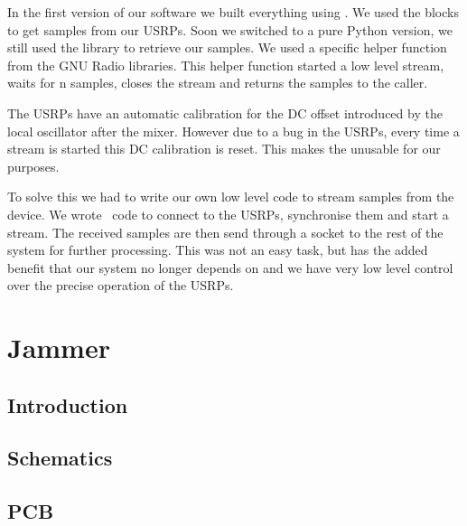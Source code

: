 \documentclass[a4paper, openany, oneside]{memoir}
\begin{document}
In the first version of our software we built everything using . We used the  blocks to get samples from our USRPs. Soon we switched to a pure Python version, we still used the  library to retrieve our samples. We used a specific helper function  from the GNU Radio libraries. This helper function started a low level stream, waits for n samples, closes the stream and returns the samples to the caller.

The USRPs have an automatic calibration for the DC offset introduced by the local oscillator after the mixer. However due to a bug in the USRPs, every time a stream is started this DC calibration is reset. This makes the  unusable for our purposes.

To solve this we had to write our own low level code to stream samples from the device. We wrote \CC~code to connect to the USRPs, synchronise them and start a stream. The received samples are then send through a socket to the rest of the system for further processing. This was not an easy task, but has the added benefit that our system no longer depends on  and we have very low level control over the precise operation of the USRPs.

\section{Jammer}
\label{sec:jammer}

\subsection{Introduction}
\label{sec:introduction-1}


\subsection{Schematics}
\label{sec:schematics}

\subsection{PCB}
\label{sec:pcb}
\end{document}
